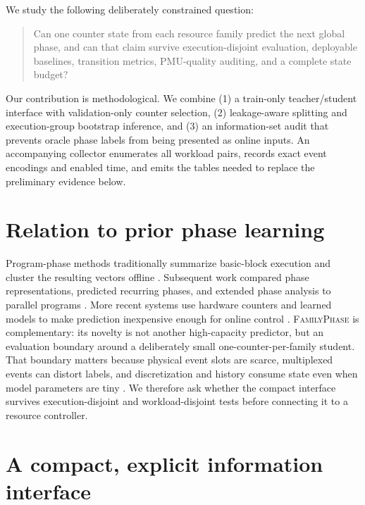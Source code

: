\documentclass{article}
\newcommand{\system}{\textsc{FamilyPhase}}
\begin{document}
We study the following deliberately constrained question:

\begin{quote}
Can one counter state from each resource family predict the next global phase, and can
that claim survive execution-disjoint evaluation, deployable baselines, transition
metrics, PMU-quality auditing, and a complete state budget?
\end{quote}

Our contribution is methodological. We combine (1) a train-only teacher/student
interface with validation-only counter selection, (2) leakage-aware splitting and
execution-group bootstrap inference, and (3) an information-set audit that prevents
oracle phase labels from being presented as online inputs. An accompanying collector
enumerates all workload pairs, records exact event encodings and enabled time, and
emits the tables needed to replace the preliminary evidence below.

\section{Relation to prior phase learning}

Program-phase methods traditionally summarize basic-block execution and cluster the
resulting vectors offline \citep{sherwood2001bbda,sherwood2002simpoint}. Subsequent
work compared phase representations, predicted recurring phases, and extended phase
analysis to parallel programs
\citep{dhodapkar2003comparing,sherwood2003phase,perelman2006parallel}. More recent
systems use hardware counters and learned models to make prediction inexpensive
enough for online control \citep{nomani2015predicting,kim2017p4,lozano2022phase}.
\system{} is complementary: its novelty is not another high-capacity predictor, but
an evaluation boundary around a deliberately small one-counter-per-family student.
That boundary matters because physical event slots are scarce, multiplexed events can
distort labels, and discretization and history consume state even when model
parameters are tiny \citep{eyerman2006cpi}. We therefore ask whether the compact
interface survives execution-disjoint and workload-disjoint tests before connecting
it to a resource controller.

\section{A compact, explicit information interface}
\end{document}
